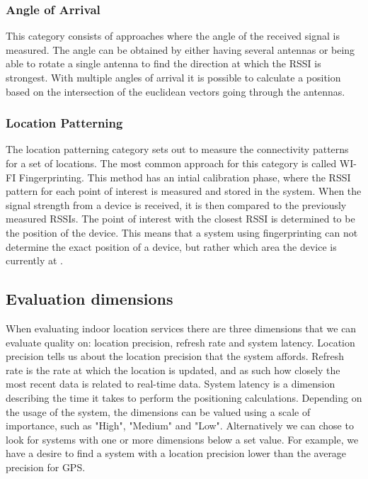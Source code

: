 \subsubsection*{Angle of Arrival}
This category consists of approaches where the angle of the received signal is measured. The angle can be obtained by either having several antennas or being able to rotate a single antenna to find the direction at which the RSSI is strongest. With multiple angles of arrival it is possible to calculate a position based on the intersection of the euclidean vectors going through the antennas.

\subsubsection*{Location Patterning}
The location patterning category sets out to measure the connectivity patterns for a set of locations. The most common approach for this category is called WI-FI Fingerprinting. This method has an intial calibration phase, where the RSSI pattern for each point of interest is measured and stored in the system. When the signal strength from a device is received, it is then compared to the previously measured RSSIs. The point of interest with the closest RSSI is determined to be the position of the device. This means that a system using fingerprinting can not determine the exact position of a device, but rather which area the device is currently at \cite{fingerprint1}.

\subsection{Evaluation dimensions}
When evaluating indoor location services there are three dimensions that we can evaluate quality on: location precision, refresh rate and system latency. Location precision tells us about the location precision that the system affords. Refresh rate is the rate at which the location is updated, and as such how closely the most recent data is related to real-time data. System latency is a dimension describing the time it takes to perform the positioning calculations\cite{dimensions}. Depending on the usage of the system, the dimensions can be valued using a scale of importance, such as "High", "Medium" and "Low". Alternatively we can chose to look for systems with one or more dimensions below a set value. For example, we have a desire to find a system with a location precision lower than the average precision for GPS. 


